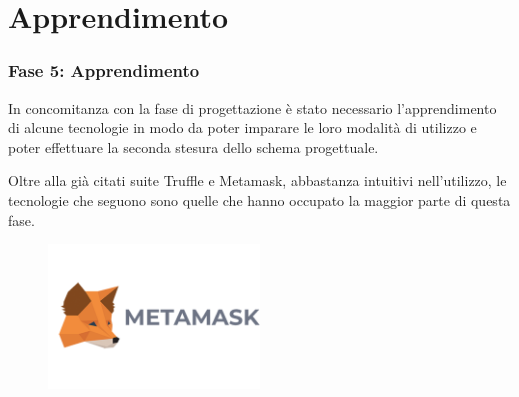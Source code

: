 \documentclass{beamer}
\begin{document}
\section{Apprendimento}
\begin{frame}
	\frametitle{Fase 5: Apprendimento}
	In concomitanza con la fase di progettazione è stato necessario l’apprendimento di alcune tecnologie in modo da poter imparare le loro modalità di utilizzo e poter effettuare la seconda stesura dello schema progettuale.

	Oltre alla già citati suite Truffle e Metamask, abbastanza intuitivi nell'utilizzo, le tecnologie che seguono sono quelle che hanno occupato la maggior parte di questa fase.
	\begin{figure}
		\includegraphics[width=0.50\textwidth]{figures/metamask.png}
	\end{figure}
\end{frame}
\end{document}
